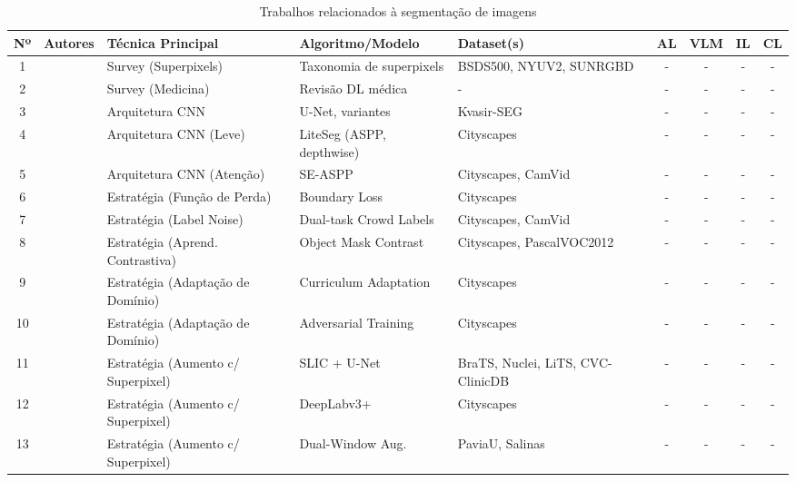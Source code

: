 \begin{table}[h!]
\centering
\caption{Trabalhos relacionados à segmentação de imagens}%
\label{tab:trabalhos_relacionados}
\tiny
\begin{adjustbox}{angle=90, max height=\textheight}
\begin{tabular}{|c|l|l|l|l|c|c|c|c|}
\hline
\textbf{Nº} & \textbf{Autores} & \textbf{Técnica Principal} & \textbf{Algoritmo/Modelo} & \textbf{Dataset(s)} & \textbf{AL} & \textbf{VLM} & \textbf{IL} & \textbf{CL} \\\hline

1 & \cite{stutz2018superpixels} & Survey (Superpixels) & Taxonomia de superpixels & BSDS500, NYUV2, SUNRGBD & - & - & - & - \\\hline
2 & \cite{hesamian2020medical} & Survey (Medicina) & Revisão DL médica & - & - & - & - & - \\\hline
3 & \cite{jha2020kvasirseg} & Arquitetura CNN & U-Net, variantes & Kvasir-SEG & - & - & - & - \\\hline
4 & \cite{emara2019liteseg} & Arquitetura CNN (Leve) & LiteSeg (ASPP, depthwise) & Cityscapes & - & - & - & - \\\hline
5 & \cite{zhang2023attention} & Arquitetura CNN (Atenção) & SE-ASPP & Cityscapes, CamVid & - & - & - & - \\\hline
6 & \cite{wang2021boundary} & Estratégia (Função de Perda) & Boundary Loss & Cityscapes & - & - & - & - \\\hline
7 & \cite{liao2023dual} & Estratégia (Label Noise) & Dual-task Crowd Labels & Cityscapes, CamVid & - & - & - & - \\\hline
8 & \cite{gansbeke2021unsupervised} & Estratégia (Aprend. Contrastiva) & Object Mask Contrast & Cityscapes, \ac{PascalVOC2012}& - & - & - & - \\\hline
9 & \cite{yang2018curriculum} & Estratégia (Adaptação de Domínio) & Curriculum Adaptation & Cityscapes & - & - & - & - \\\hline
10 & \cite{hoffman2016unsupervised} & Estratégia (Adaptação de Domínio) & Adversarial Training & Cityscapes & - & - & - & - \\\hline
11 & \cite{zhang2019spda} & Estratégia (Aumento c/ Superpixel) & \ac{SLIC} + U-Net & BraTS, Nuclei, LiTS, CVC-ClinicDB & - & - & - & - \\\hline
12 & \cite{franchi2021robust} & Estratégia (Aumento c/ Superpixel) & DeepLabv3+ & Cityscapes & - & - & - & - \\\hline
13 & \cite{zhang2020dualwindow} & Estratégia (Aumento c/ Superpixel) & Dual-Window Aug. & PaviaU, Salinas & - & - & - & - \\\hline

\end{tabular}
\end{adjustbox}
\end{table}
